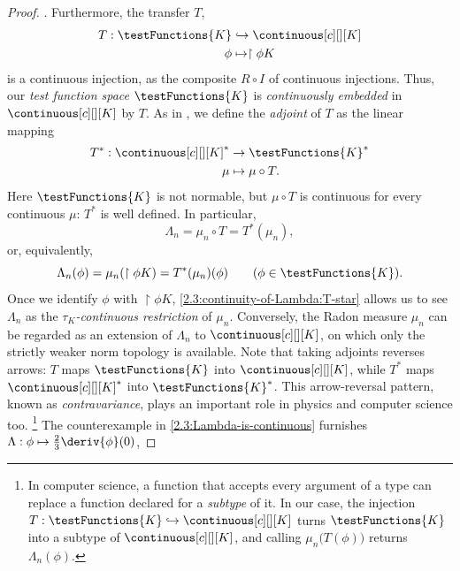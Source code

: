 \begin{proof}
. Furthermore, the transfer $T$,
% 
\begin{align}
  T: \testFunctions{K} &\hookrightarrow \continuous[c][][K] \\
  \phi &\mapsto \restriction{\phi}{K} \nonumber
\end{align}
%
is a continuous injection, as the composite $R \circ I$ of continuous injections. Thus, our \emph{test function space} %
$\testFunctions{K}$ is \emph{continuously embedded} in $\continuous[c][][K]$ by $T$. As in , we define the %
\emph{adjoint} of $T$ as the linear mapping
% 
\begin{align}
  T^\ast: \continuous[c][][K]^\ast &\to \testFunctions{K}^\ast \\
  \mu &\mapsto \mu \circ T. \nonumber
\end{align}
% 
Here $\testFunctions{K}$ is not normable, but $\mu \circ T$ is continuous for every continuous $\mu$: $T^\ast$ is well %
defined. In particular, 
% 
\begin{equation}
  \Lambda_n = \mu_n \circ T = T^\ast(\mu_n), 
\end{equation}
%
or, equivalently, 
% 
\begin{equation}\label{2.3:continuity-of-Lambda:T-star}
  \Lambda_n(\phi) = \mu_n(\restriction{\phi}{K}) = T^\ast (\mu_n)(\phi) \qquad(\phi \in \testFunctions{K}).
\end{equation}
%
Once we identify $\phi$ with $\restriction{\phi}{K}$, \eqref{2.3:continuity-of-Lambda:T-star} allows us to see $\Lambda_n$ as %
the \emph{$\tau_K$-continuous restriction} of $\mu_n$. Conversely, the Radon measure $\mu_n$ can be regarded as an extension %
of $\Lambda_n$ to $\continuous[c][][K]$, on which only the strictly weaker norm topology is available. Note that taking %
adjoints reverses arrows: $T$ maps $\testFunctions{K}$ into $\continuous[c][][K]$, while $T^\ast$ maps %
$\continuous[c][][K]^\ast$ into $\testFunctions{K}^\ast$. This arrow-reversal pattern, known as \emph{contravariance}, plays %
an important role in physics and computer science too.%
%
\footnote{%
  In computer science, a function that accepts every argument of a type can replace a function declared for a %
  \emph{subtype} of it. In our case, the injection $T:\testFunctions{K} \hookrightarrow \continuous[c][][K]$ turns %
  $\testFunctions{K}$ into a subtype of $\continuous[c][][K]$, and calling $\mu_n\bigl(T(\phi)\bigr)$ returns %
  $\Lambda_n(\phi)$. 
}%
%
\skipline
The counterexample in \eqref{2.3:Lambda-is-continuous} furnishes $\Lambda: \phi \mapsto \frac{2}{3}\deriv{\phi}(0)$, %

\end{proof}
